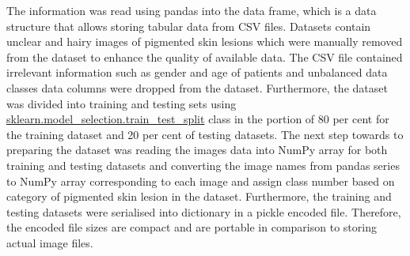 The information was read using pandas into the data frame, 
which is a data structure that allows storing tabular data from CSV files. 
Datasets contain unclear and hairy images of pigmented skin lesions which were manually 
removed from the dataset to enhance the quality of available data.
The CSV file contained irrelevant information such as gender and age of 
patients and unbalanced data classes data columns were dropped from the dataset. Furthermore, the dataset was divided into training and 
testing sets using \url{sklearn.model_selection.train_test_split} class in the portion of 80 per cent for 
the training dataset and 20 per cent of testing datasets. The next step towards to preparing the dataset was reading the images data into NumPy 
array for both training and testing datasets and converting the image names from pandas series to NumPy array corresponding to each image and assign class number 
based on category of pigmented skin lesion in the dataset. Furthermore, the training and testing datasets were serialised into 
dictionary in a pickle encoded file. Therefore, the encoded file sizes are compact and are portable
in comparison to storing actual image files.